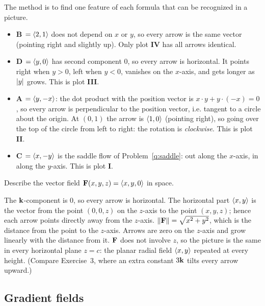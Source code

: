\begin{solution}
The method is to find one feature of each formula that can be recognized in a picture.
\begin{itemize}
\item \textbf{B $=\left\langle 2,1 \right\rangle$} does not depend on $x$ or $y$, so every arrow is the same
      vector (pointing right and slightly up). Only plot \textbf{IV} has all arrows identical.
\item \textbf{D $=\left\langle y,0 \right\rangle$} has second component $0$, so every arrow is horizontal. It points
      right when $y>0$, left when $y<0$, vanishes on the $x$-axis, and gets longer as $\lvert y\rvert$
      grows. This is plot \textbf{III}.
\item \textbf{A $=\left\langle y,-x \right\rangle$}: the dot product with the position vector is $x\cdot y+y\cdot(-x)=0$,
      so every arrow is perpendicular to the position vector, i.e. tangent to a circle
      about the origin. At $(0,1)$ the arrow is $\left\langle 1,0 \right\rangle$ (pointing right), so going over the
      top of the circle from left to right: the rotation is \emph{clockwise}. This is plot \textbf{II}.
\item \textbf{C $=\left\langle x,-y \right\rangle$} is the saddle flow of Problem~\ref{q:saddle}: out along the
      $x$-axis, in along the $y$-axis. This is plot \textbf{I}.
\end{itemize}
\end{solution}

\begin{problem}\label{q:3d}
Describe the vector field $\mathbf{F}(x,y,z)=\left\langle x,y,0 \right\rangle$ in space.
\end{problem}
\begin{solution}
 The $\mathbf{k}$-component is $0$, so every arrow is horizontal. The
horizontal part $\left\langle x,y \right\rangle$ is the vector from the point $(0,0,z)$ on the $z$-axis to the
point $(x,y,z)$; hence each arrow points directly away from the $z$-axis.
 $\lVert\mathbf{F}\rVert=\sqrt{x^2+y^2}$, which is the distance from the point to the
$z$-axis. Arrows are zero on the $z$-axis and grow linearly with the distance from it.
 $\mathbf{F}$ does not involve $z$, so the picture is the same in every
horizontal plane $z=c$: the planar radial field $\left\langle x,y \right\rangle$ repeated at every height.
(Compare Exercise~3, where an extra constant $3\mathbf{k}$ tilts every arrow upward.)
\end{solution}

\subsection{Gradient fields}

